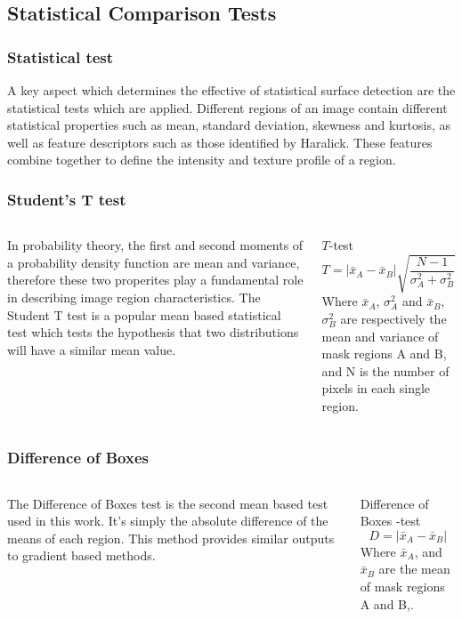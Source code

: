 \documentclass[9pt]{beamer}
\begin{document}
\subsection{Statistical Comparison Tests}
\begin{frame}
\frametitle{ Statistical test }
A key aspect which determines the effective of statistical surface detection are the statistical tests which are applied. Different regions of an image contain different statistical properties such as mean, standard deviation, skewness and kurtosis, as well as feature descriptors such as those identified by Haralick. These features combine together to define the intensity and texture profile of a region.\\



\end{frame}
\begin{frame}
\frametitle{ Student's T test }
\begin{columns}
In probability theory, the first and second moments of a probability density function are mean and variance, therefore these two properites play a fundamental role in describing image region characteristics. The Student T test is a popular mean based statistical test which tests the hypothesis that two distributions will have a similar mean value.
\begin{block}{ $T$-test}
			\begin{equation}
				T = |\bar{x}_{A} - \bar{x}_{B}|\sqrt{\frac{N-1}{\sigma_{A}^{2} + \sigma_{B}^{2}}}
			\end{equation}
		Where $\bar{x}_{A}$, $\sigma_{A}^{2}$ and $\bar{x}_{B}$, $\sigma_{B}^{2}$ are respectively the mean and variance of mask regions A and B, and N is the number of pixels in each single region. 
		\end{block}
		\end{columns}
\end{frame}

\begin{frame}
\frametitle{ Difference of Boxes }
\begin{columns}
The Difference of Boxes test is the second mean based test used in this work. It's simply the absolute difference of the means of each region. This method provides similar outputs to gradient based methods.
\begin{block}{ Difference of Boxes -test}
			\begin{equation}
				D= |\bar{x}_{A} - \bar{x}_{B}|
			\end{equation}
		Where $\bar{x}_{A}$, and $\bar{x}_{B}$ are the mean  of mask regions A and B,. 
		\end{block}
		\end{columns}
\end{frame}
\end{document}
